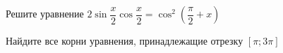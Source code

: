 \begin{ex}
	\begin{condition}
		\begin{enumcols}[label=\asbuk*)]
			\item Решите уравнение \( 2\sin {\dfrac{x}{2}}\cos{\dfrac{x}{2}} = \cos^2{\left(\dfrac{\pi}{2}+x\right)} \)
			\item Найдите все корни уравнения, принадлежащие отрезку \( \left[\pi;3\pi\right] \)
		\end{enumcols}
	\end{condition}
\end{ex}